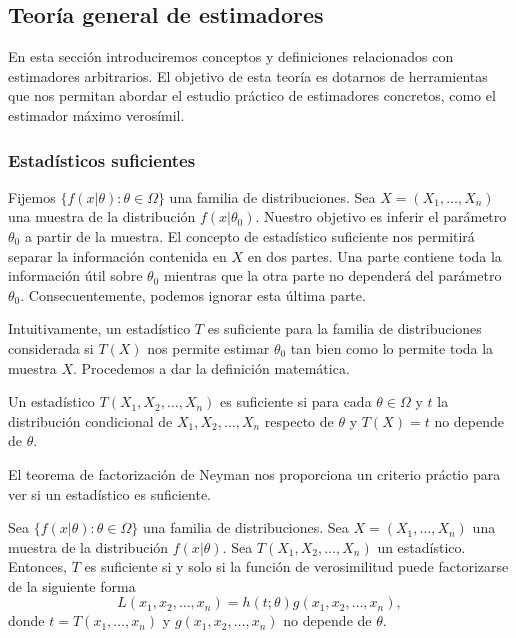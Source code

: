 \documentclass{article}
\begin{document}
    \subsection{Teoría general de estimadores}

    En esta sección introduciremos conceptos y definiciones relacionados con estimadores arbitrarios. El objetivo de esta teoría es dotarnos de herramientas que nos permitan abordar el estudio práctico de estimadores concretos, como el estimador máximo verosímil.

    \subsubsection{Estadísticos suficientes}

        Fijemos $\{f(x|\theta): \theta \in \Omega\}$ una familia de distribuciones. Sea $X = (X_1 , \ldots, X_n)$ una muestra de la distribución $f(x|\theta_0)$. Nuestro objetivo es inferir el parámetro $\theta_0$ a partir de la muestra. El concepto de estadístico suficiente nos permitirá separar la información contenida en $X$ en dos partes. Una parte contiene toda la información útil sobre $\theta_0$ mientras que la otra parte no dependerá del parámetro $\theta_0$. Consecuentemente, podemos ignorar esta última parte.

        Intuitivamente, un estadístico $T$ es suficiente para la familia de distribuciones considerada si $T(X)$ nos permite estimar $\theta_0$ tan bien como lo permite toda la muestra $X$. Procedemos a dar la definición matemática.

        \begin{definition}
            Un estadístico $T(X_1, X_2, \ldots, X_n)$ es suficiente si para cada $\theta \in \Omega$ y $t$ la distribución condicional de $X_1, X_2, \ldots, X_n$ respecto de $\theta$ y $T(X) = t$ no depende de $\theta$.
        \end{definition}

        El teorema de factorización de Neyman nos proporciona un criterio práctio para ver si un estadístico es suficiente.

        \begin{thm}
            Sea $\{f(x|\theta): \theta \in \Omega\}$ una familia de distribuciones. Sea $X = (X_1 , \ldots, X_n)$ una muestra de la distribución $f(x|\theta)$. Sea $T(X_1, X_2, \ldots, X_n)$ un estadístico. Entonces, $T$ es  suficiente si y solo si la función de verosimilitud puede factorizarse de la siguiente forma
            \[L(x_1, x_2, \ldots, x_n) = h(t;\theta) g(x_1, x_2, \ldots, x_n),\]
            donde $t = T(x_1, \ldots, x_n)$ y $g(x_1, x_2, \ldots, x_n)$ no depende de $\theta$.
        \end{thm}
\end{document}
